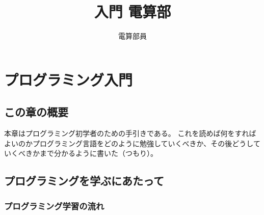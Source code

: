\documentclass[lualatex,ja=standard,12pt,a4j]{bxjsbook}
\title{入門 電算部}
\author{電算部員}
\begin{document}
	\tableofcontents
	\chapter{プログラミング入門}
		\section{この章の概要}
                本章はプログラミング初学者のための手引きである。
                これを読めば何をすればよいのかプログラミング言語をどのように勉強していくべきか、その後どうしていくべきかまで分かるように書いた（つもり）。
		\section{プログラミングを学ぶにあたって}
			\subsection{プログラミング学習の流れ}
\end{document}
